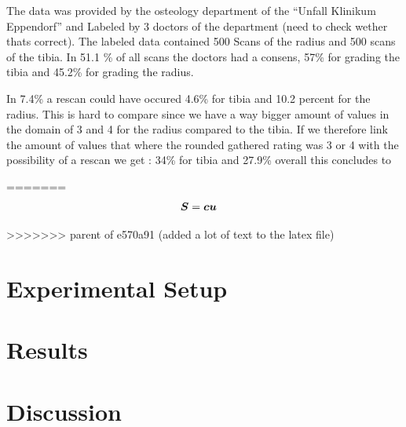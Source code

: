 \documentclass[
a4paper, 
12pt,
grayscalebody, %
abstract=on,
twoside, BCOR10mm, 12pt, DIV13,headinclude, footexclude, final, abstracton, openright
]{ibireprt}
\numberwithin{equation}{chapter}
\numberwithin{table}{chapter}
\numberwithin{figure}{chapter}
\numberwithin{algorithm}{chapter}
\numberwithin{example}{chapter}
\numberwithin{example}{chapter}
\newcommand{\zb}[1]{\mbox{\boldmath{${#1}$}}}
\begin{document}
The data was provided by the osteology department of the ``Unfall Klinikum Eppendorf'' and Labeled by 3 doctors of the department (need to check wether thats correct). The labeled data contained 500 Scans of the radius and 500 scans of the tibia. In  51.1 \% of all scans the doctors had a consens, 57\% for grading the tibia and 45.2\% for grading the radius. 

In 7.4\% a rescan could have occured 4.6\% for tibia and 10.2 percent for the radius. This is hard to compare since we have a way bigger amount of values in the domain of 3 and 4 for the radius compared to the tibia. If we therefore link the amount of values that where the rounded gathered rating was 3 or 4 with the possibility of a rescan we get : 34\% for tibia and 27.9\% overall this concludes to  %



=======
\begin{align}
 \zb S &= \zb c \zb u
\end{align}

>>>>>>> parent of e570a91 (added a lot of text to the latex file)
\chapter{Experimental Setup}



\chapter{Results}

\chapter{Discussion}


\end{document}
